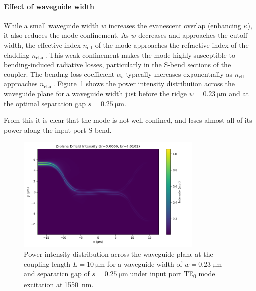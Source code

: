 \documentclass[10pt, a4paper]{article}
\begin{document}
\paragraph{Effect of waveguide width}
While a small waveguide width \(w\) increases the evanescent overlap (enhancing \(\kappa\)),
it also reduces the mode confinement. As \(w\) decreases and approaches the cutoff width, the effective index \(n_\text{eff}\) of the mode approaches the refractive index of the cladding \(n_\text{clad}\).
This weak confinement makes the mode highly susceptible to bending-induced radiative losses, particularly in the S-bend sections of the coupler. The bending loss coefficient \(\alpha_b\) typically increases exponentially as \(n_\text{eff}\) approaches \(n_\text{clad}\)\autocite{sakaiSimplifiedBendingLoss1979}.
Figure~\ref{fig:high_bend_loss} shows the power intensity distribution across the waveguide plane
for a waveguide width just before the ridge \(w=\SI{0.23}{\um}\) and at the optimal separation gap \(s=\SI{0.25}{\um}\).

From this it is clear that the mode is not well confined, and loses almost all of its power along the input port S-bend.

\begin{figure}[h!]
  \centering
  \includegraphics[width=0.8\textwidth]{task3/sim_0524_120625/z_plane_intensity.png}
  \caption{Power intensity distribution across the waveguide plane at the coupling length \(L=\SI{10}{\um}\) for a waveguide width of \(w=\SI{0.23}{\um}\) and separation gap of \(s=\SI{0.25}{\um}\) under input port TE\textsubscript{0} mode excitation at \SI{1550}{\nm}.}
  \label{fig:high_bend_loss}
\end{figure}
\end{document}
